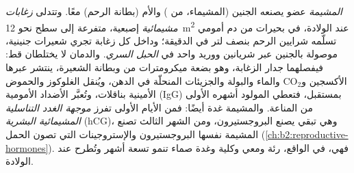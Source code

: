 \begin{definition}[المشيمة]\label{def:b2:mammal-reproduction:placenta}
\emph{المشيمة} عضو يصنعه الجنين (المشيماء، من ) والأم (بطانة الرحم) معًا.
وتتدلى \emph{زغابات مشيمائية} إصبعية، متفرعة إلى سطح نحو
\qty{12}{m^2} عند الولادة، في بحيرات من دم أمومي تسلّمه
شرايين الرحم بنصف لتر في الدقيقة؛ وداخل كل زغابة
تجري شعيرات جنينية، موصولة بالجنين عبر شريانين
ووريد واحد في \emph{الحبل السري}. والدمان لا يختلطان قط:
فيفصلهما جدار الزغابة، وهو بضعة ميكرومترات من
 وبطانة الشعيرة، ينتشر عبرها الأكسجين
و$\mathrm{CO_2}$ والماء والبولة والجزيئات المنحلّة في الدهن،
ويُنقل الغلوكوز والحموض الأمينية بناقلات،
وتُعبَّر الأضداد الأمومية (IgG) بمستقبل، فتعطي المولود
أشهره الأولى من المناعة. والمشيمة غدة أيضًا: فمن
الأيام الأولى تفرز  \emph{موجهة الغدد
التناسلية المشيمائية البشرية} (hCG)، وهي تبقي  يصنع
البروجستيرون، ومن الشهر الثالث تصنع المشيمة نفسها
البروجستيرون والإستروجينات التي تصون الحمل
(\cref{ch:b2:reproductive-hormones}). فهي، في الواقع، رئة
ومعي وكلية وغدة صماء تنمو تسعة أشهر
وتُطرح عند الولادة.
\end{definition}

